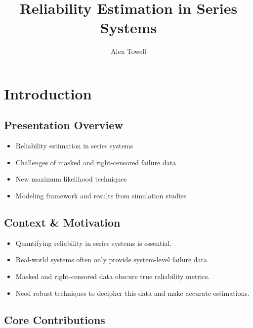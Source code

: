 \documentclass[]{tufte-book}
\title{Reliability Estimation in Series Systems}
\author{Alex Towell}
\date{}
\providecommand{\tightlist}{%
  \setlength{\itemsep}{0pt}\setlength{\parskip}{0pt}}
\theoremstyle{definition}
\theoremstyle{plain}
\begin{document}
\maketitle



{
\setcounter{tocdepth}{1}
\tableofcontents
}

\hypertarget{introduction}{%
\chapter{Introduction}\label{introduction}}

\hypertarget{presentation-overview}{%
\section{Presentation Overview}\label{presentation-overview}}

\begin{itemize}
\tightlist
\item
  Reliability estimation in series systems
\item
  Challenges of masked and right-censored failure data
\item
  New maximum likelihood techniques
\item
  Modeling framework and results from simulation studies
\end{itemize}

\hypertarget{context-motivation}{%
\section{Context \& Motivation}\label{context-motivation}}

\begin{itemize}
\tightlist
\item
  Quantifying reliability in series systems is essential.
\item
  Real-world systems often only provide system-level failure data.
\item
  Masked and right-censored data obscure true reliability metrics.
\item
  Need robust techniques to decipher this data and make accurate estimations.
\end{itemize}

\hypertarget{core-contributions}{%
\section{Core Contributions}\label{core-contributions}}
\end{document}
